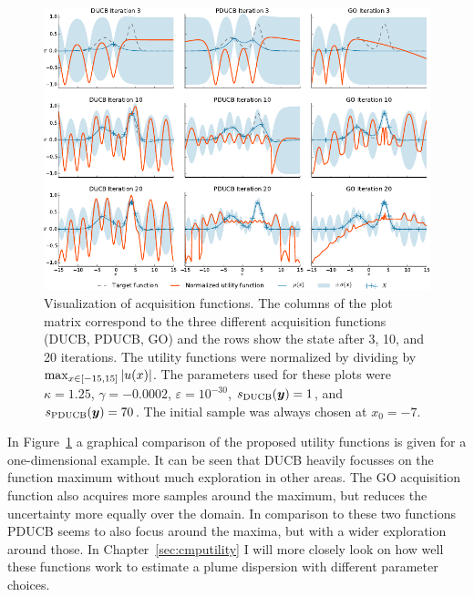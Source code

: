 \begin{figure}
    \centering
    \includegraphics{plots/acqfns}
    \caption[Visualization of acquisition functions]{Visualization of 
    acquisition functions. The columns of the plot matrix correspond to the 
    three different acquisition functions (DUCB, PDUCB, GO) and the rows show 
    the state after 3, 10, and 
        20 iterations.  The utility functions were normalized by dividing by 
           $\max_{x \in \intcc{-15, 15}} \abs[0]{u(x)}$.
        The parameters used for these plots were $\kappa = 1.25$, $\gamma 
        = -0.0002$, $\varepsilon = 10^{-30}$, $s_{\mathrm{DUCB}}(\bm{y}) = 1$, and 
        $s_{\mathrm{PDUCB}}(\bm{y}) = 70$. The initial sample was always chosen at $x_0 
        = -7$.}\label{fig:acqfns}
\end{figure}
In Figure~\ref{fig:acqfns} a graphical comparison of the proposed utility 
functions is given for a one-dimensional example. It can be seen that DUCB 
heavily focusses on the function maximum without much exploration in other 
areas. The GO acquisition function also acquires more samples around the 
maximum, but reduces the uncertainty more equally over the domain. In comparison 
to these two functions PDUCB seems to also focus around the maxima, but with 
a wider exploration around those. In Chapter~\ref{sec:cmputility} I will more 
closely look on how well these functions work to estimate a plume dispersion 
with different parameter choices.

